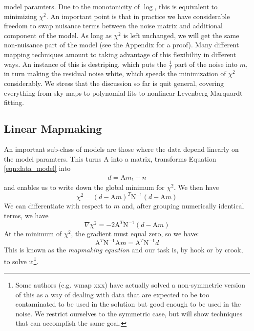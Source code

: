 \documentclass[12]{article}
\begin{document}
model paramters.  Due to the monotonicity of $\log$, this is
equivalent to minimizing $\chi^2$.  An important point is that in
practice we have considerable freedom to swap nuisance terms between
the noise matrix and additional component of the model.  As long as
$\chi^2$ is left unchanged, we will get the same non-nuisance part
of the model (see the Appendix for a proof).  Many different mapping techniques amount to taking
advantage of this flexibility in different ways.  An instance of this is
destriping, which puts the $\frac{1}{f}$ part of the noise into $m$,
in turn making the residual noise white, which speeds the minimization
of $\chi^2$ considerably.  We stress that the discussion so far is
quit general, covering everything from sky maps to polynomial fits to nonlinear
Levenberg-Marquardt fitting.

\subsection{Linear Mapmaking}
An important sub-class of models are those where the data depend
linearly on the model paramters.  This turns $\mathrm{A}$ into a
matrix, transforms Equation \ref{eqn:data_model} into
\begin{eqnarray}
\label{eqn:linear_model}
d=\mathrm{A}m_t + n
\end{eqnarray}
and enables us to write down the global minimum for $\chi^2$.
We then have 
\begin{equation}
\chi^2 = \left (d-\mathrm{A}m\right )^T \mathrm{N}^{-1} \left (
d-\mathrm{A}m \right )
\end{equation}
We can differentiate with respect to $m$ and, after grouping
numerically identical terms, we have
\begin{equation}
\nabla \chi^2 = -2\mathrm{A}^T \mathrm{N}^{-1} \left
(d-\mathrm{A}m\right )
\end{equation}
At the minimum of $\chi^2$, the gradient must equal zero, so we have:
\begin{equation}
\label{eqn:mapmaking}
\mathrm{A}^T \mathrm{N}^{-1} \mathrm{A}m = \mathrm{A}^T \mathrm{N}^{-1}
d
\end{equation}
This is known as the {\textit{mapmaking equation}} and our task is, by
hook or by crook, to solve it\footnote{Some authors (e.g. wmap xxx)
  have actually solved a non-symmetric version of this as a way of
  dealing with data that are expected to be too contaminated to be
  used in the solution but good enough to be used in the noise.  We
  restrict ourselves to the symmetric case, but will show techniques
  that can accomplish the same goal.}.  
\end{document}
